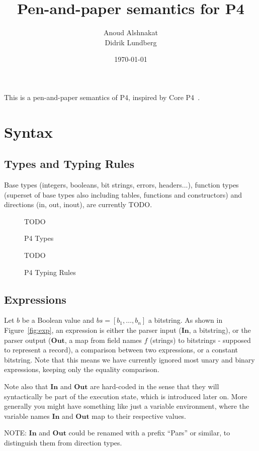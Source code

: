 \documentclass[UTF8]{article}
\title{%
Pen-and-paper semantics for P4}
\author{Anoud Alshnakat\\
Didrik Lundberg
}
\date{\today}
\begin{document}
\maketitle
\noindent
This is a pen-and-paper semantics of P4, inspired by Core P4~\cite{doenges2021petr4}.

\section{Syntax}
\subsection{Types and Typing Rules}

Base types (integers, booleans, bit strings, errors, headers...), function types (superset of base types also including tables, functions and constructors) and directions (in, out, inout), are currently TODO.

\begin{figure}[h!]
\centering
TODO
\caption{P4 Types}
\end{figure}

\begin{figure}[h!]
\centering
TODO
\caption{P4 Typing Rules}
\end{figure}

\newpage
\subsection{Expressions}

Let $b$ be a Boolean value and $\mathit{bs} = [b_1 , \ldots , b_n]$ a bitstring. As shown in Figure~\ref{fig:exp}, an expression is either the parser input ($\mathbf{In}$, a bitstring), or the parser output ($\mathbf{Out}$, a map from field names $f$ (strings) to bitstrings - supposed to represent a record), a comparison between two expressions, or a constant bitstring. Note that this means we have currently ignored most unary and binary expressions, keeping only the equality comparison.

Note also that $\mathbf{In}$ and $\mathbf{Out}$ are hard-coded in the sense that they will syntactically be part of the execution state, which is introduced later on. More generally you might have something like just a variable environment, where the variable names $\mathbf{In}$ and $\mathbf{Out}$ map to their respective values.

{\color{red} NOTE: $\mathbf{In}$ and $\mathbf{Out}$ could be renamed with a prefix ``Pars'' or similar, to distinguish them from direction types.}
\end{document}
